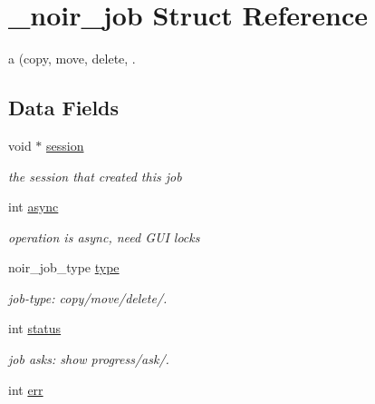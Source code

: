 \hypertarget{struct__noir__job}{
\section{\_\-noir\_\-job Struct Reference}
\label{struct__noir__job}
}
a (copy, move, delete, .  


\subsection*{Data Fields}
\begin{CompactItemize}
\item 
\hypertarget{struct__noir__job_o0}{
void $\ast$ \hyperlink{struct__noir__job_o0}{session}}
\label{struct__noir__job_o0}

\begin{CompactList}\small\item\em the session that created this job \item\end{CompactList}\item 
\hypertarget{struct__noir__job_o1}{
int \hyperlink{struct__noir__job_o1}{async}}
\label{struct__noir__job_o1}

\begin{CompactList}\small\item\em operation is async, need GUI locks \item\end{CompactList}\item 
noir\_\-job\_\-type \hyperlink{struct__noir__job_o2}{type}
\begin{CompactList}\small\item\em job-type: copy/move/delete/. \item\end{CompactList}\item 
int \hyperlink{struct__noir__job_o3}{status}
\begin{CompactList}\small\item\em job asks: show progress/ask/. \item\end{CompactList}\item 
\hypertarget{struct__noir__job_o4}{
int \hyperlink{struct__noir__job_o4}{err}}
\label{struct__noir__job_o4}


\end{CompactItemize}
